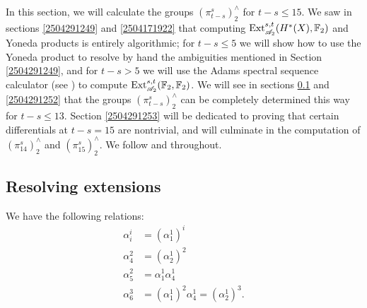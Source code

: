 \documentclass{MetricNotes2023}
\def\bb{\ensuremath\mathbb}
\def\A{\ensuremath{\mathscr{A}_2}}
\DeclareMathOperator{\Ext}{Ext}
\begin{document}
In this section, we will calculate the groups \((\pi_{t-s}^s)^\wedge_2\) for \(t-s\leq 15\). We saw in sections \ref{2504291249} and  \ref{2504171922} that computing \(\Ext^{s,t}_{\A}(H^*(X), \bb{F}_2)\) and Yoneda products is entirely algorithmic; for \(t-s\leq 5\) we will show how to use the Yoneda product to resolve by hand the ambiguities mentioned in Section \ref{2504291249}, and for \(t-s > 5\) we will use the Adams spectral sequence calculator (see \autocite{sseq}) to compute \(\Ext^{s,t}_{\A}(\bb{F}_2, \bb{F}_2)\). We will see in sections \ref{2504291251} and \ref{2504291252} that the groups \((\pi_{t-s}^s)^\wedge_2\) can be completely determined this way for \(t-s \leq 13\). Section \ref{2504291253} will be dedicated to proving that certain differentials at \(t-s=15\) are nontrivial, and will culminate in the computation of \((\pi_{14}^s)^\wedge_2\) and \((\pi_{15}^s)^\wedge_2\). We follow \autocite{ass} and \autocite{rognes2} throughout. 

\subsection{Resolving extensions}\label{2504291251}

\begin{proposition}
We have the following relations:
\begin{align*}
\alpha^i_i &= (\alpha_1^1)^i\\
\alpha_4^2&=(\alpha^1_2)^2\\
\alpha^2_5&=\alpha^1_1 \alpha^1_4\\
\alpha^3_6&=(\alpha^1_1)^2 \alpha_4^1=(\alpha^1_2)^3.
\end{align*}
\end{proposition}
\end{document}
